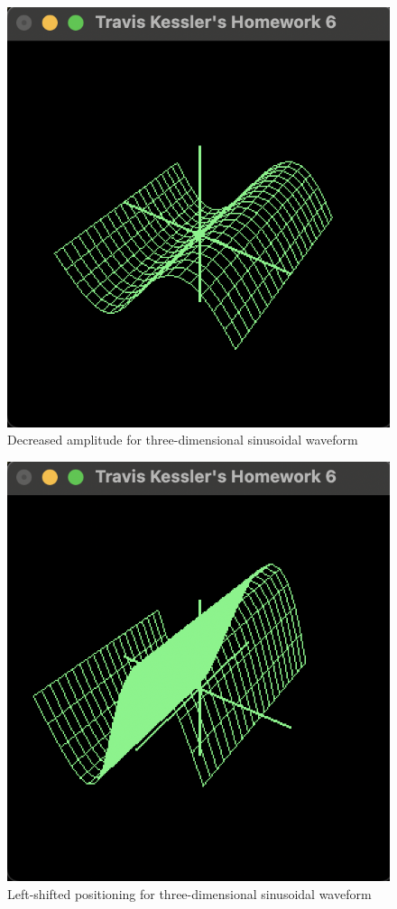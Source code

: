 \documentclass{report}
\begin{document}
	\begin{figure}[!ht]
		\centering
		\includegraphics[scale=0.7, trim={0 0.05cm 0 0.0cm}, clip]{figures/3d_d.png}
		\caption{Decreased amplitude for three-dimensional sinusoidal waveform}
	\end{figure}
	
	\begin{figure}[!ht]
		\centering
		\includegraphics[scale=0.7, trim={0 0.05cm 0 0.0cm}, clip]{figures/3d_l.png}
		\caption{Left-shifted positioning for three-dimensional sinusoidal waveform}
	\end{figure}
	
\end{document}

